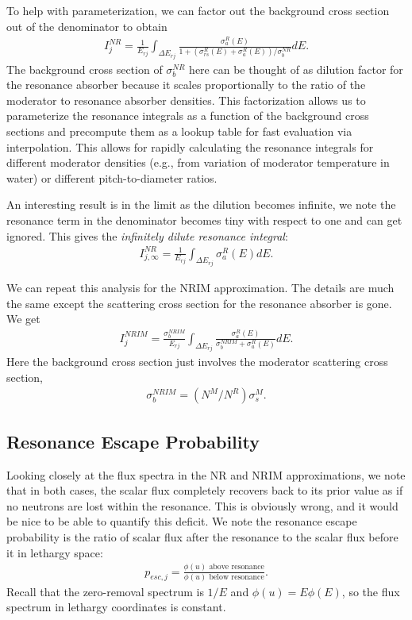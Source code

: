 To help with parameterization, we can factor out the background cross section out of the denominator to obtain
\begin{align}
  I_j^{NR} = \frac{ 1 }{E_{rj}} \int_{\Delta E_{rj}} \frac{ \sigma_a^R(E)  }{ 1 + ( \sigma_{rs}^R(E) + \sigma_a^R(E) ) / \sigma_b^{NR} } dE .
\end{align}
The background cross section of $\sigma_b^{NR}$ here can be thought of as dilution factor for the resonance absorber because it scales proportionally to the ratio of the moderator to resonance absorber densities. This factorization allows us to parameterize the resonance integrals as a function of the background cross sections and precompute them as a lookup table for fast evaluation via interpolation. This allows for rapidly calculating the resonance integrals for different moderator densities (e.g., from variation of moderator temperature in water) or different pitch-to-diameter ratios. 

An interesting result is in the limit as the dilution becomes infinite, we note the resonance term in the denominator becomes tiny with respect to one and can get ignored. This gives the \emph{infinitely dilute resonance integral}:
\begin{align}
  I_{j,\infty}^{NR} = \frac{ 1 }{E_{rj}} \int_{\Delta E_{rj}} \sigma_a^R(E) dE .
\end{align}

We can repeat this analysis for the NRIM approximation. The details are much the same except the scattering cross section for the resonance absorber is gone. We get
\begin{align}
  I_j^{NRIM} = \frac{ \sigma_b^{NRIM} }{E_{rj}} \int_{\Delta E_{rj}} \frac{ \sigma_a^R(E)  }{ \sigma_b^{NRIM} + \sigma_a^R(E) } dE . \label{Eq:thermalization_resonanceIntegral_NRIM}
\end{align}
Here the background cross section just involves the moderator scattering cross section,
\begin{align}
  \sigma_b^{NRIM} = (N^M/N^R) \sigma_s^M . \label{Eq:thermalization_backgroundXS_NRIM}
\end{align}

\subsection{Resonance Escape Probability}

Looking closely at the flux spectra in the NR and NRIM approximations, we note that in both cases, the scalar flux completely recovers back to its prior value as if no neutrons are lost within the resonance. This is obviously wrong, and it would be nice to be able to quantify this deficit. We note the resonance escape probability is the ratio of scalar flux after the resonance to the scalar flux before it in lethargy space:
\begin{align}
  p_{esc,j} = \frac{\phi(u) \text{ above resonance}}{\phi(u) \text{ below resonance}} . \nonumber
\end{align}
Recall that the zero-removal spectrum is $1/E$ and $\phi(u) = E\phi(E)$, so the flux spectrum in lethargy coordinates is constant.

